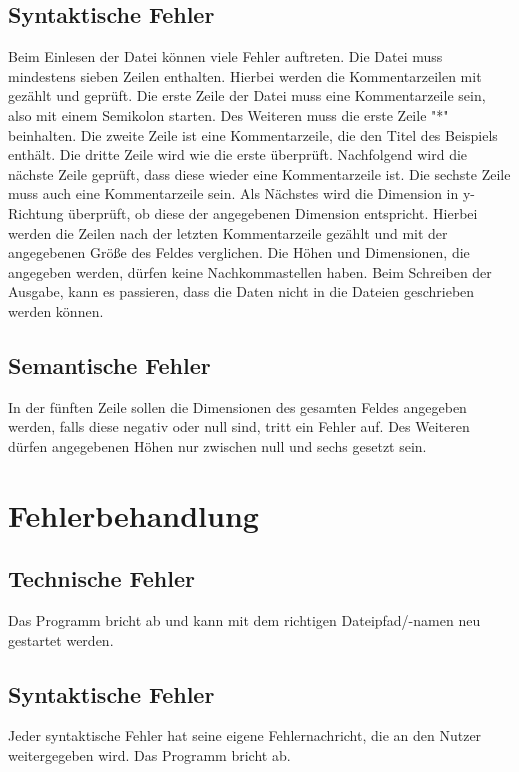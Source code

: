 \subsection{Syntaktische Fehler}\label{subsec:syntaktische-fehler}
Beim Einlesen der Datei können viele Fehler auftreten.
Die Datei muss mindestens sieben Zeilen enthalten.
Hierbei werden die Kommentarzeilen mit gezählt und geprüft.
Die erste Zeile der Datei muss eine Kommentarzeile sein, also mit einem Semikolon starten.
Des Weiteren muss die erste Zeile "*" beinhalten.
Die zweite Zeile ist eine Kommentarzeile, die den Titel des Beispiels enthält.
Die dritte Zeile wird wie die erste überprüft.
Nachfolgend wird die nächste Zeile geprüft, dass diese wieder eine Kommentarzeile ist.
Die sechste Zeile muss auch eine Kommentarzeile sein.
Als Nächstes wird die Dimension in y-Richtung überprüft, ob diese der angegebenen Dimension entspricht.
Hierbei werden die Zeilen nach der letzten Kommentarzeile gezählt und mit der angegebenen Größe des Feldes verglichen.
Die Höhen und Dimensionen, die angegeben werden, dürfen keine Nachkommastellen haben.
Beim Schreiben der Ausgabe, kann es passieren, dass die Daten nicht in die Dateien geschrieben werden können.

\subsection{Semantische Fehler}\label{subsec:semantische-fehler}
In der fünften Zeile sollen die Dimensionen des gesamten Feldes angegeben werden, falls diese negativ oder null sind, tritt ein Fehler auf.
Des Weiteren dürfen angegebenen Höhen nur zwischen null und sechs gesetzt sein.

\section{Fehlerbehandlung}\label{sec:fehlerbehandlung}

\subsection{Technische Fehler}\label{subsec:technische-fehler-behandlung}
Das Programm bricht ab und kann mit dem richtigen Dateipfad/-namen neu gestartet werden.

\subsection{Syntaktische Fehler}\label{subsec:syntaktische-fehler-behandlung}
Jeder syntaktische Fehler hat seine eigene Fehlernachricht, die an den Nutzer weitergegeben wird.
Das Programm bricht ab.


